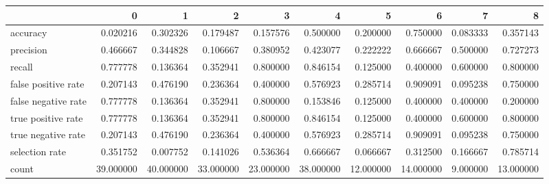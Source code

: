 \begin{tabular}{lrrrrrrrrr}
\toprule
{} &          0 &          1 &          2 &          3 &          4 &          5 &          6 &         7 &          8 \\
\midrule
accuracy            &   0.020216 &   0.302326 &   0.179487 &   0.157576 &   0.500000 &   0.200000 &   0.750000 &  0.083333 &   0.357143 \\
precision           &   0.466667 &   0.344828 &   0.106667 &   0.380952 &   0.423077 &   0.222222 &   0.666667 &  0.500000 &   0.727273 \\
recall              &   0.777778 &   0.136364 &   0.352941 &   0.800000 &   0.846154 &   0.125000 &   0.400000 &  0.600000 &   0.800000 \\
false positive rate &   0.207143 &   0.476190 &   0.236364 &   0.400000 &   0.576923 &   0.285714 &   0.909091 &  0.095238 &   0.750000 \\
false negative rate &   0.777778 &   0.136364 &   0.352941 &   0.800000 &   0.153846 &   0.125000 &   0.400000 &  0.400000 &   0.200000 \\
true positive rate  &   0.777778 &   0.136364 &   0.352941 &   0.800000 &   0.846154 &   0.125000 &   0.400000 &  0.600000 &   0.800000 \\
true negative rate  &   0.207143 &   0.476190 &   0.236364 &   0.400000 &   0.576923 &   0.285714 &   0.909091 &  0.095238 &   0.750000 \\
selection rate      &   0.351752 &   0.007752 &   0.141026 &   0.536364 &   0.666667 &   0.066667 &   0.312500 &  0.166667 &   0.785714 \\
count               &  39.000000 &  40.000000 &  33.000000 &  23.000000 &  38.000000 &  12.000000 &  14.000000 &  9.000000 &  13.000000 \\
\bottomrule
\end{tabular}
